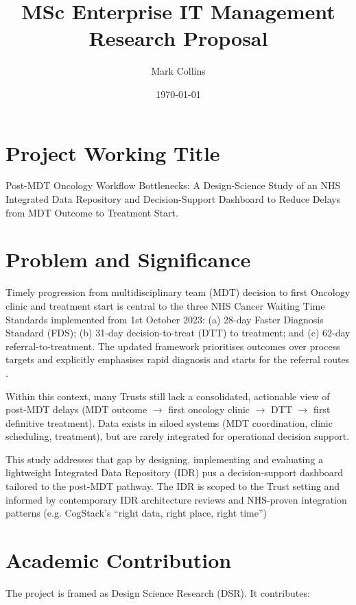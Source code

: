 \documentclass[12pt, a4paper, twoside]{article} %
\title{MSc Enterprise IT Management Research Proposal}
\author{Mark Collins}
\date{\today}
\begin{document}
\maketitle

\section{Project Working Title}
Post-MDT Oncology Workflow Bottlenecks: A Design-Science Study of an NHS Integrated Data Repository and Decision-Support Dashboard to Reduce Delays from MDT Outcome to Treatment Start.

\section{Problem and Significance}

Timely progression from multidisciplinary team (MDT) decision to first Oncology clinic and treatment start is central to the three NHS Cancer Waiting Time Standards implemented from 1st October 2023: (a) 28-day Faster Diagnosis Standard (FDS); (b) 31-day decision-to-treat (DTT) to treatment; and (c) 62-day referral-to-treatment. The updated framework prioritises outcomes over process targets and explicitly emphasises rapid diagnosis and starts for the referral routes  \citep{johnson2024, NHSDigital2026}. 

Within this context, many Trusts still lack a consolidated, actionable view of post-MDT delays (MDT outcome $\rightarrow$ first oncology clinic $\rightarrow$ DTT $\rightarrow$ first definitive treatment). Data exists in siloed systems (MDT coordination, clinic scheduling, treatment), but are rarely integrated for operational decision support. 

This study addresses that gap by designing, implementing and evaluating a lightweight Integrated Data Repository (IDR) pus a decision-support dashboard tailored to the post-MDT pathway. The IDR is scoped to the Trust setting and informed by contemporary IDR architecture reviews and NHS-proven integration patterns (e.g. CogStack's ``right data, right place, right time'') \citep{gagalova2020, jackson2018}

\section{Academic Contribution}

The project is framed as Design Science Research (DSR). It contributes:
\end{document}
